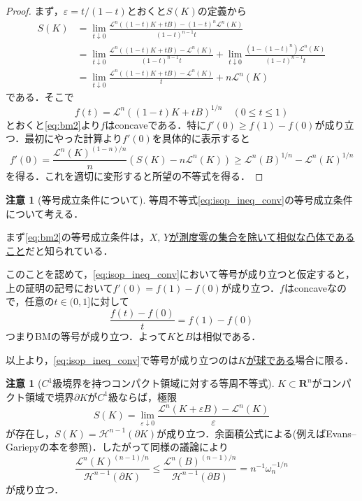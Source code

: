 \documentclass[a4j]{ltjsarticle}
\newcommand{\Rset}{\mathbf{R}}
\newcommand{\Lm}{\mathcal{L}}
\newcommand{\Hm}{\mathcal{H}}
\newcommand{\1}{\bm{1}}
\numberwithin{equation}{section}
\theoremstyle{definition}
\newtheorem{rmk}[thm]{注意}
\begin{document}
\begin{proof}
    まず，$\varepsilon=t/(1-t)$とおくと$S(K)$の定義から
    \begin{align}
        S(K)&=\lim_{t\downarrow0}\frac{\Lm^n((1-t)K+tB)-(1-t)^n\Lm^n(K)}{(1-t)^{n-1}t}\\
        &=\lim_{t\downarrow0}\frac{\Lm^n((1-t)K+tB)-\Lm^n(K)}{(1-t)^{n-1}t}+\lim_{t\downarrow0}\frac{(1-(1-t)^n)\Lm^n(K)}{(1-t)^{n-1}t}\\
        &=\lim_{t\downarrow 0}\frac{\Lm^n((1-t)K+tB)-\Lm^n(K)}{t}+n\Lm^n(K)
    \end{align}
    である．そこで
    \begin{equation}
        f(t)=\Lm^n((1-t)K+tB)^{1/n}\quad (0\leq t\leq 1)
    \end{equation}
    とおくと\eqref{eq:bm2}より$f$はconcaveである．特に$f'(0)\geq f(1)-f(0)$が成り立つ．最初にやった計算より$f'(0)$を具体的に表示すると
    \begin{equation}
        f'(0)=\frac{\Lm^n(K)^{(1-n)/n}}{n}(S(K)-n\Lm^n(K))\geq \Lm^n(B)^{1/n}-\Lm^n(K)^{1/n}
    \end{equation}
    を得る．これを適切に変形すると所望の不等式を得る．
\end{proof}
\begin{rmk}[等号成立条件について]
    等周不等式\eqref{eq:isop_ineq_conv}の等号成立条件について考える．
    
    まず\eqref{eq:bm2}の等号成立条件は，\underline{$X,\,Y$が測度零の集合を除いて相似な凸体であること}だと知られている．

    このことを認めて，\eqref{eq:isop_ineq_conv}において等号が成り立つと仮定すると，上の証明の記号において$f'(0)=f(1)-f(0)$が成り立つ．$f$はconcaveなので，任意の$t\in(0,1]$に対して
    \begin{equation}
        \frac{f(t)-f(0)}{t}=f(1)-f(0)
    \end{equation}
    つまりBMの等号が成り立つ．よって$K$と$B$は相似である．

    以上より，\eqref{eq:isop_ineq_conv}で等号が成り立つのは\underline{$K$が球である}場合に限る．
\end{rmk}
\begin{rmk}[$C^1$級境界を持つコンパクト領域に対する等周不等式]
    $K\subset \Rset^n$がコンパクト領域で境界$\partial K$が$C^1$級ならば，極限
    \begin{equation}
        S(K)=\lim_{\varepsilon\downarrow0}\frac{\Lm^n(K+\varepsilon B)-\Lm^n(K)}{\varepsilon}
    \end{equation}
    が存在し，$S(K)=\Hm^{n-1}(\partial K)$が成り立つ．余面積公式による(例えばEvans--Gariepyの本\cite{EG}を参照)．したがって同様の議論により
    \begin{equation}
        \frac{\Lm^n(K)^{(n-1)/n}}{\Hm^{n-1}(\partial K)}\leq \frac{\Lm^n(B)^{(n-1)/n}}{\Hm^{n-1}(\partial B)}=n^{-1}\omega_n^{-1/n}\label{eq:isop_ineq_c1}\tag{IP2}
    \end{equation}
    が成り立つ．
\end{rmk}
\end{document}
